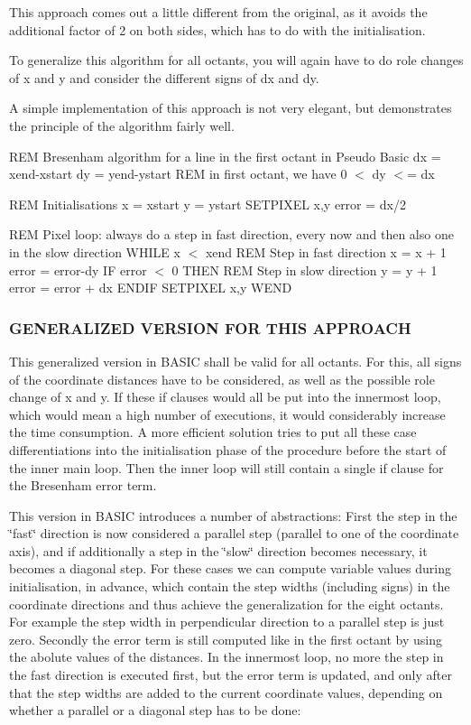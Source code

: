This approach comes out a little different from the original, as it avoids the additional factor of 2 on both sides, which has to do with the initialisation.

To generalize this algorithm for all octants, you will again have to do role changes of x and y and consider the different signs of dx and dy.

A simple implementation of this approach is not very elegant, but demonstrates the principle of the algorithm fairly well.

R\+EM Bresenham algorithm for a line in the first octant in Pseudo Basic dx = xend-\/xstart dy = yend-\/ystart R\+EM in first octant, we have 0 $<$ dy $<$= dx

R\+EM Initialisations x = xstart y = ystart S\+E\+T\+P\+I\+X\+EL x,y error = dx/2

R\+EM Pixel loop\+: always do a step in fast direction, every now and then also one in the slow direction W\+H\+I\+LE x $<$ xend R\+EM Step in fast direction x = x + 1 error = error-\/dy IF error $<$ 0 T\+H\+EN R\+EM Step in slow direction y = y + 1 error = error + dx E\+N\+D\+IF S\+E\+T\+P\+I\+X\+EL x,y W\+E\+ND

\subsubsection*{G\+E\+N\+E\+R\+A\+L\+I\+Z\+ED V\+E\+R\+S\+I\+ON F\+OR T\+H\+IS A\+P\+P\+R\+O\+A\+CH}

This generalized version in B\+A\+S\+IC shall be valid for all octants. For this, all signs of the coordinate distances have to be considered, as well as the possible role change of x and y. If these if clauses would all be put into the innermost loop, which would mean a high number of executions, it would considerably increase the time consumption. A more efficient solution tries to put all these case differentiations into the initialisation phase of the procedure before the start of the inner main loop. Then the inner loop will still contain a single if clause for the Bresenham error term.

This version in B\+A\+S\+IC introduces a number of abstractions\+: First the step in the \char`\"{}fast\char`\"{} direction is now considered a parallel step (parallel to one of the coordinate axis), and if additionally a step in the \char`\"{}slow\char`\"{} direction becomes necessary, it becomes a diagonal step. For these cases we can compute variable values during initialisation, in advance, which contain the step widths (including signs) in the coordinate directions and thus achieve the generalization for the eight octants. For example the step width in perpendicular direction to a parallel step is just zero. Secondly the error term is still computed like in the first octant by using the abolute values of the distances. In the innermost loop, no more the step in the fast direction is executed first, but the error term is updated, and only after that the step widths are added to the current coordinate values, depending on whether a parallel or a diagonal step has to be done\+:

